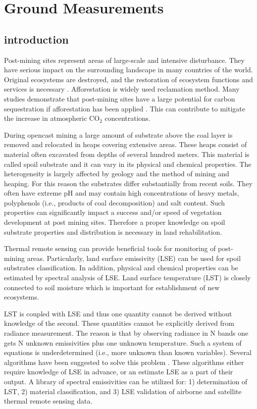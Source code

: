 \chapter{Ground Measurements}

\section{introduction}

Post-mining sites represent areas of large-scale and intensive disturbance. They have serious impact on the surrounding landscape in many countries of the world. Original ecosystems are destroyed, and the restoration of ecosystem functions and services is necessary \cite{BH01}. Afforestation is widely used reclamation method. Many studies demonstrate that post-mining sites have a large potential for carbon sequestration if afforestation has been applied \cite{VF13, FL13, SL05, UL06}. This can contribute to mitigate the increase in atmospheric $\mathrm{CO_2}$ concentrations.

During opencast mining a large amount of substrate above the coal layer is removed and relocated in heaps covering extensive areas. These heaps consist of material often excavated from depths of several hundred meters. This material is called spoil substrate and it can vary in its physical and chemical properties. The heterogeneity is largely affected by geology and the method of mining and heaping. For this reason the substrates differ substantially from recent soils. They often have extreme pH and may contain high concentrations of heavy metals, polyphenols (i.e., products of coal decomposition) and salt content. Such properties can significantly impact a success and/or speed of vegetation development at post mining sites. Therefore a proper knowledge on spoil substrate properties and distribution is necessary in land rehabilitation. 

Thermal remote sensing can provide beneficial tools for monitoring of post-mining areas. Particularly, land surface emissivity (LSE) can be used for spoil substrates classification. In addition, physical and chemical properties can be estimated by spectral analysis of LSE. Land surface temperature (LST) is closely connected to soil moisture which is important for establishment of new ecosystems.

LST is coupled with LSE and thus one quantity cannot be derived without knowledge of the second. These quantities cannot be explicitly derived from radiance measurement. The reason is that by observing radiance in N bands one gets N unknown emissivities plus one unknown temperature. Such a system of equations is underdetermined (i.e., more unknown than known variables). Several algorithms have been suggested to solve this problem \cite{LT13}. These algorithms either require knowledge of LSE in advance, or an estimate LSE as a part of their output. A library of spectral emissivities can be utilized for: 1) determination of LST, 2) material classification, and 3) LSE validation of airborne and satellite thermal remote sensing data.

